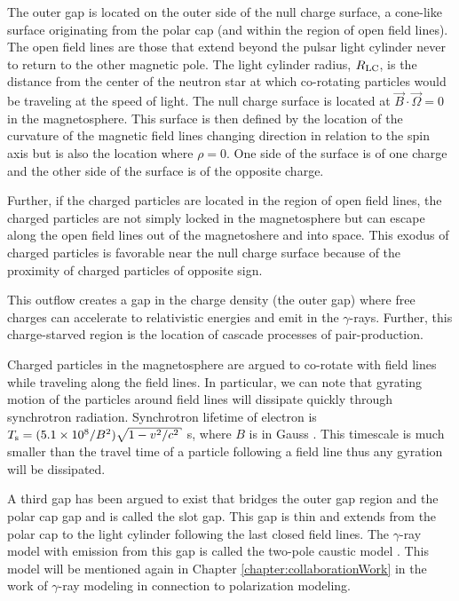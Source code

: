 The outer gap is located on the outer side of the null charge surface,
a cone-like surface originating from the polar cap (and within
the region of open field lines).  
The open field lines are those that extend beyond the pulsar light cylinder
never to return to the other magnetic pole.
The light cylinder radius, $R_{\rm{LC}}$, is the distance from the
center of the neutron star at which co-rotating particles would be traveling at the
speed of light.
The null charge surface
is located at $\vec{B}\cdot\vec{\Omega}=0$ in the magnetosphere.  This surface
is then defined by the location of the curvature of the magnetic 
field lines changing direction in relation to the spin axis but is
also the location where $\rho=0$.  One side of the surface is of one charge
and the other side of the surface is of the opposite charge.  

Further, if the charged particles are located in the region of open 
field lines, the charged particles are not simply locked in the
magnetosphere but can escape along the open field lines out of the 
magnetoshere and into space.  This exodus of charged particles is
favorable near the null charge surface because of the proximity 
of charged particles of opposite sign.  

This outflow creates a gap in the charge density (the outer gap)
where free charges can accelerate to relativistic energies and
emit in the $\gamma$-rays.  Further, this charge-starved
region is the location of cascade processes of pair-production. 

Charged particles in the magnetosphere are argued to co-rotate 
with field lines while traveling along the field lines.
In particular, we can note that gyrating motion of the 
particles around field lines will dissipate quickly through
synchrotron radiation.  
Synchrotron lifetime of electron is $T_{\rm s}=(5.1\times10^8 /B^2)\sqrt{1-v^2/c^2} $ s,
where $B$ is in Gauss
\citep{lyne2006pulsar}.
This timescale is much smaller than
the travel time of a particle following a field line thus
any gyration will be dissipated.

A third gap has been argued to exist that bridges the outer gap region
and the polar cap gap and is called the slot gap.  
This gap is thin and extends from the polar cap to the light cylinder following
the last closed field lines.
The $\gamma$-ray model with emission from
this gap is called the two-pole caustic model \citep{dyks2003two}. 
This model will be mentioned again in Chapter \ref{chapter:collaborationWork} 
in the work of $\gamma$-ray modeling in connection to polarization modeling.
